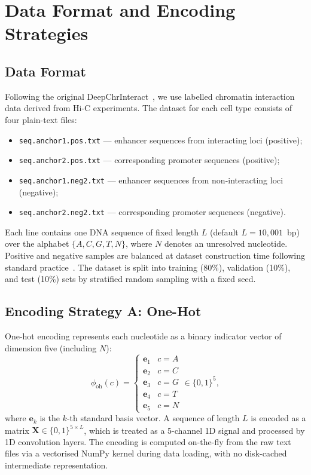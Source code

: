 \section{Data Format and Encoding Strategies}
\label{sec:data}

\subsection{Data Format}

Following the original DeepChrInteract~\cite{deepchrinteract_doc}, we use labelled
chromatin interaction data derived from Hi-C experiments.
The dataset for each cell type consists of four plain-text files:

\begin{itemize}[noitemsep]
  \item \texttt{seq.anchor1.pos.txt} --- enhancer sequences from interacting loci (positive);
  \item \texttt{seq.anchor2.pos.txt} --- corresponding promoter sequences (positive);
  \item \texttt{seq.anchor1.neg2.txt} --- enhancer sequences from non-interacting loci (negative);
  \item \texttt{seq.anchor2.neg2.txt} --- corresponding promoter sequences (negative).
\end{itemize}

Each line contains one DNA sequence of fixed length $L$ (default $L = 10{,}001$~bp)
over the alphabet $\{A, C, G, T, N\}$, where $N$ denotes an unresolved nucleotide.
Positive and negative samples are balanced at dataset construction time following
standard practice~\cite{speid}.
The dataset is split into training (80\%), validation (10\%), and test (10\%) sets
by stratified random sampling with a fixed seed.

\subsection{Encoding Strategy A: One-Hot}

One-hot encoding represents each nucleotide as a binary indicator vector of
dimension five (including $N$):
\begin{equation}
  \phi_{\mathrm{oh}}(c) =
  \begin{cases}
    \mathbf{e}_1 & c = A \\
    \mathbf{e}_2 & c = C \\
    \mathbf{e}_3 & c = G \\
    \mathbf{e}_4 & c = T \\
    \mathbf{e}_5 & c = N
  \end{cases}
  \in \{0,1\}^5,
\end{equation}
where $\mathbf{e}_k$ is the $k$-th standard basis vector.
A sequence of length $L$ is encoded as a matrix $\mathbf{X} \in \{0,1\}^{5 \times L}$,
which is treated as a 5-channel 1D signal and processed by 1D convolution layers.
The encoding is computed on-the-fly from the raw text files via a vectorised
NumPy kernel during data loading, with no disk-cached intermediate representation.

